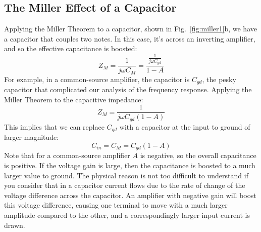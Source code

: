 \subsection{The Miller Effect of a Capacitor}
Applying the Miller Theorem to a capacitor, shown in Fig.~\ref{fig:miller1}b, we have a capacitor that couples two notes.  In this case, it's across an inverting amplifier, and so the effective capacitance is boosted:
\begin{equation}
	Z_M = \frac{1}{j\omega C_M} = \frac{\frac{1}{j\omega C_{gd}}}{ 1 - A}
\end{equation}
For example, in a common-source amplifier, the capacitor is $C_{gd}$, the pesky capacitor that complicated our analysis of the frequency response.  Applying the Miller Theorem to the capacitive impedance: 
\begin{equation}
	Z_M = \frac{1}{j\omega C_{gd} (1 - A)}
\end{equation}
This implies that we can replace $C_{gd}$ with a capacitor at the input to ground of larger magnitude:
\begin{equation}
	C_{in} = C_M  = C_{gd} (1-A)
\end{equation}
Note that for a common-source amplifier $A$ is negative, so the overall capacitance is positive.  If the voltage gain is large, then the capacitance is boosted to a much larger value to ground.  The physical reason is not too difficult to understand if you consider that in a capacitor current flows due to the rate of change of the voltage difference  across the capacitor.  An amplifier with negative gain will boost this voltage difference, causing one terminal to move with a much larger amplitude compared to the other, and a correspondingly larger input current is drawn. 
